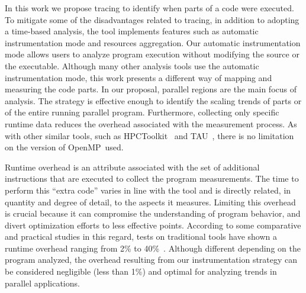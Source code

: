 In this work we propose tracing to identify when parts of a code were executed. 
To mitigate some of the disadvantages related to tracing, in addition to adopting a time-based analysis, the tool implements features such as automatic instrumentation mode and resources aggregation.
Our automatic instrumentation mode allows users to analyze program execution without modifying the source or the executable.
Although many other analysis tools use the automatic instrumentation mode, this work presents a different way of mapping and measuring the code parts. 
In our proposal, parallel regions are the main focus of analysis. 
The strategy is effective enough to identify the scaling trends of parts or of the entire running parallel program.
Furthermore, collecting only specific runtime data reduces the overhead associated with the measurement process.
As with other similar tools, such as HPCToolkit~\cite{Adhianto2010} and TAU~\cite{Shende2006}, there is no limitation on the version of OpenMP~used.

Runtime overhead is an attribute associated with the set of additional instructions that are executed to collect the program measurements. The time to perform this ``extra code'' varies in line with the tool and is directly related, in quantity and degree of detail, to the aspects it measures. 
Limiting this overhead is crucial because it can compromise the understanding of program behavior, and divert optimization efforts to less effective points. 
According to some comparative and practical studies in this regard, tests on traditional tools have shown a runtime overhead ranging from 2\% to 40\%~\cite{Eriksson2016}.
Although different depending on the program analyzed, the overhead resulting from our instrumentation strategy can be considered negligible (less than 1\%) and optimal for analyzing trends in parallel applications.

